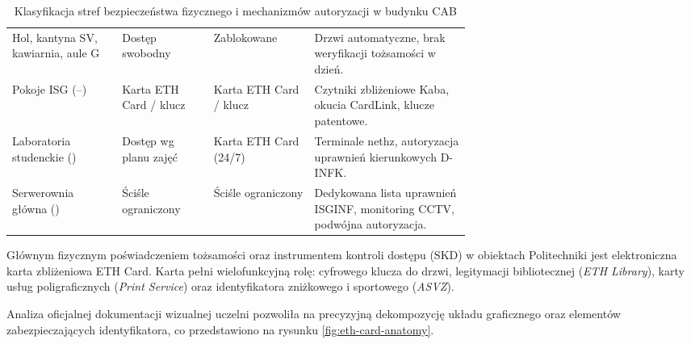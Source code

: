 \begin{table}[H]
    \centering
    \caption{Klasyfikacja stref bezpieczeństwa fizycznego i mechanizmów autoryzacji w budynku CAB}\label{tab:strefy-dostepu-cab}
    \tablefont
    \begin{tabularx}{\linewidth}{L{0.24\linewidth} C{0.20\linewidth} C{0.22\linewidth} Y}
        \toprule
         &  &  &  \\
        \midrule
        Hol, kantyna SV, kawiarnia, aule G & Dostęp swobodny & Zablokowane & Drzwi automatyczne, brak weryfikacji tożsamości w dzień. \\
        Pokoje ISG (--) & Karta ETH Card / klucz & Karta ETH Card / klucz & Czytniki zbliżeniowe Kaba, okucia CardLink, klucze patentowe. \\
        Laboratoria studenckie () & Dostęp wg planu zajęć & Karta ETH Card (24/7) & Terminale nethz, autoryzacja uprawnień kierunkowych D-INFK. \\
        Serwerownia główna () & Ściśle ograniczony & Ściśle ograniczony & Dedykowana lista uprawnień ISGINF, monitoring CCTV, podwójna autoryzacja. \\
        \bottomrule
    \end{tabularx}
\end{table}


Głównym fizycznym poświadczeniem tożsamości oraz instrumentem kontroli dostępu (SKD) w obiektach Politechniki jest elektroniczna karta zbliżeniowa ETH Card. Karta pełni wielofunkcyjną rolę: cyfrowego klucza do drzwi, legitymacji bibliotecznej (\textit{ETH Library}), karty usług poligraficznych (\textit{Print Service}) oraz identyfikatora zniżkowego i sportowego (\textit{ASVZ}).

Analiza oficjalnej dokumentacji wizualnej uczelni pozwoliła na precyzyjną dekompozycję układu graficznego oraz elementów zabezpieczających identyfikatora, co przedstawiono na rysunku \ref{fig:eth-card-anatomy}.


